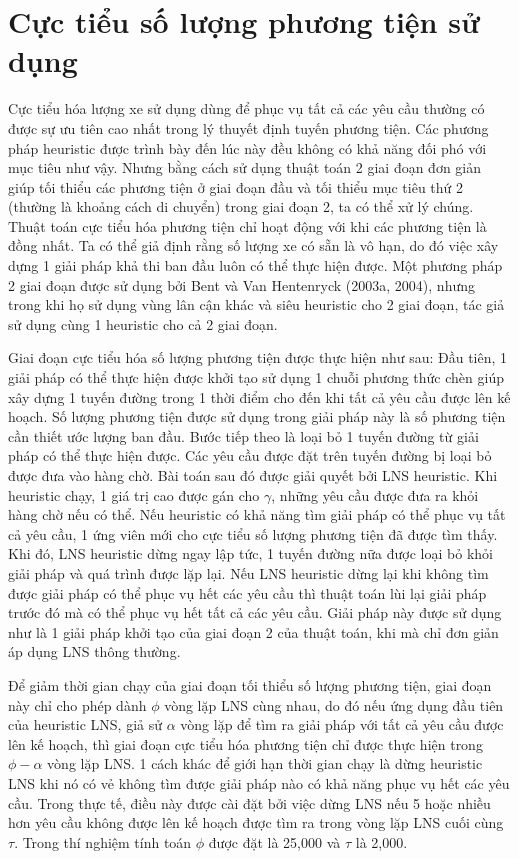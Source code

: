 \section{Cực tiểu số lượng phương tiện sử dụng}
Cực tiểu hóa lượng xe sử dụng dùng để phục vụ tất cả các yêu cầu thường có được sự ưu tiên cao nhất trong lý thuyết định tuyến phương tiện. Các phương pháp heuristic được trình bày đến lúc này đều không có khả năng đối phó với mục tiêu như vậy. Nhưng bằng cách sử dụng thuật toán 2 giai đoạn đơn giản giúp tối thiểu các phương tiện ở giai đoạn đầu và tối thiểu mục tiêu thứ 2 (thường là khoảng cách di chuyển) trong giai đoạn 2, ta có thể xử lý chúng. Thuật toán cực tiểu hóa phương tiện chỉ hoạt động với khi các phương tiện là đồng nhất. Ta có thể giả định rằng số lượng xe có sẵn là vô hạn, do đó việc xây dựng 1 giải pháp khả thi ban đầu luôn có thể thực hiện được. Một phương pháp 2 giai đoạn được sử dụng bởi Bent và Van Hentenryck (2003a, 2004), nhưng trong khi họ sử dụng vùng lân cận khác và siêu heuristic cho 2 giai đoạn, tác giả sử dụng cùng 1 heuristic cho cả 2 giai đoạn.

Giai đoạn cực tiểu hóa số lượng phương tiện được thực hiện như sau: Đầu tiên, 1 giải pháp có thể thực hiện được khởi tạo sử dụng 1 chuỗi phương thức chèn giúp xây dựng 1 tuyến đường trong 1 thời điểm cho đến khi tất cả yêu cầu được lên kế hoạch. Số lượng phương tiện được sử dụng trong giải pháp này là số  phương tiện cần thiết ước lượng ban đầu. Bước tiếp theo là loại bỏ 1 tuyến đường từ giải pháp có thể thực hiện được. Các yêu cầu được đặt trên tuyến đường bị loại bỏ được đưa vào hàng chờ. Bài toán sau đó được giải quyết bởi LNS heuristic. Khi heuristic chạy, 1 giá trị cao được gán cho $\gamma$, những yêu cầu được đưa ra khỏi hàng chờ nếu có thể. Nếu heuristic có khả năng tìm giải pháp có thể phục vụ tất cả yêu cầu, 1 ứng viên mới cho cực tiểu số lượng phương tiện đã được tìm thấy. Khi đó, LNS heuristic dừng ngay lập tức, 1 tuyến đường nữa được loại bỏ khỏi giải pháp và quá trình được lặp lại. Nếu LNS heuristic dừng lại khi không tìm được giải pháp có thể phục vụ hết các yêu cầu thì thuật toán lùi lại giải pháp trước đó mà có thể phục vụ hết tất cả các yêu cầu. Giải pháp này được sử dụng như là 1 giải pháp khởi tạo của giai đoạn 2 của thuật toán, khi mà chỉ đơn giản áp dụng LNS thông thường.

Để giảm thời gian chạy của giai đoạn tối thiểu số lượng phương tiện, giai đoạn này chỉ cho phép dành $\phi$ vòng lặp LNS cùng nhau, do đó nếu ứng dụng đầu tiên của heuristic LNS, giả sử $\alpha$ vòng lặp để tìm ra giải pháp với tất cả yêu cầu được lên kế hoạch, thì giai đoạn cực tiểu hóa phương tiện chỉ được thực hiện trong $\phi - \alpha$ vòng lặp LNS. 1 cách khác để giới hạn thời gian chạy là dừng heuristic LNS khi nó có vẻ không tìm được giải pháp nào có khả năng phục vụ hết các yêu cầu. Trong thực tế, điều này được cài đặt bởi việc dừng LNS nếu 5 hoặc nhiều hơn yêu cầu không được lên kế hoạch được tìm ra trong vòng lặp LNS cuối cùng $\tau$. Trong thí nghiệm tính toán $\phi$ được đặt là 25,000 và $\tau$ là 2,000.
